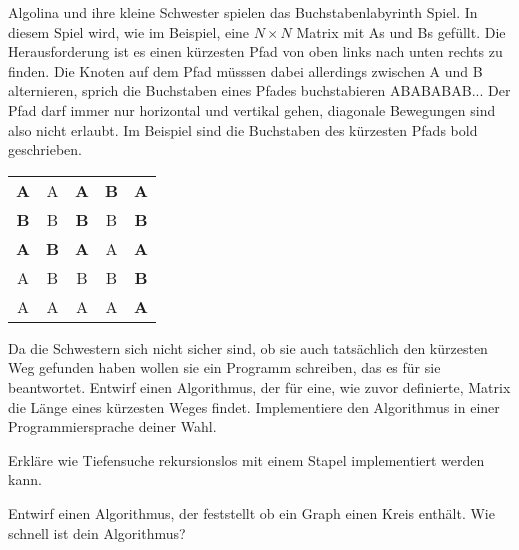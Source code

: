 \documentclass{uebung_cs}
\begin{document}
\begin{aufgabe}[Buchstabenlabyrinth]
	Algolina und ihre kleine Schwester spielen das Buchstabenlabyrinth Spiel.
	In diesem Spiel wird, wie im Beispiel, eine $N\times N$ Matrix mit As und Bs gefüllt.
	Die Herausforderung ist es einen kürzesten Pfad von oben links nach unten rechts zu finden.
	Die Knoten auf dem Pfad müsssen dabei allerdings zwischen A und B alternieren, sprich die Buchstaben eines Pfades buchstabieren ABABABAB...
	Der Pfad darf immer nur horizontal und vertikal gehen, diagonale Bewegungen sind also nicht erlaubt.
	Im Beispiel sind die Buchstaben des kürzesten Pfads bold geschrieben.
	\begin{center}
		\begin{tabular}{ccccc}
			\textbf{A} & A & \textbf{A} & \textbf{B} & \textbf{A}\\
			\textbf{B} & B & \textbf{B} & B & \textbf{B}\\
			\textbf{A} & \textbf{B} & \textbf{A} & A & \textbf{A}\\
			A & B & B & B & \textbf{B}\\
			A & A & A & A & \textbf{A}
		\end{tabular}
	\end{center}
	Da die Schwestern sich nicht sicher sind, ob sie auch tatsächlich den kürzesten Weg gefunden haben wollen sie ein Programm schreiben, das es für sie beantwortet.
	Entwirf einen Algorithmus, der für eine, wie zuvor definierte, Matrix die Länge eines kürzesten Weges findet.
	Implementiere den Algorithmus in einer Programmiersprache deiner Wahl.
\end{aufgabe}

\begin{aufgabe}
	Erkläre wie Tiefensuche rekursionslos mit einem Stapel implementiert werden kann.
\end{aufgabe}

\begin{aufgabe}
	Entwirf einen Algorithmus, der feststellt ob ein Graph einen Kreis enthält.
	Wie schnell ist dein Algorithmus?
\end{aufgabe}
\end{document}
